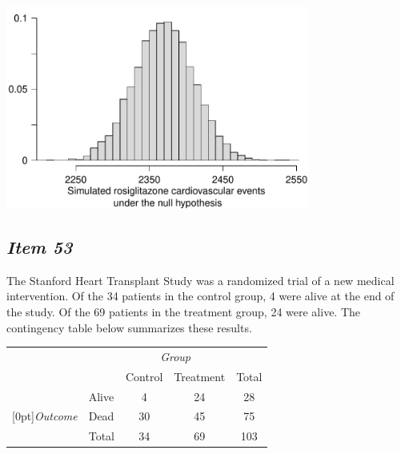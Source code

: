 \begin{center}


\includegraphics[width = 0.75\textwidth]{includes/avandia_RandHist} \\


\end{center}





\subsection{\textbf{\textit{Item 53}}}








The Stanford Heart Transplant Study was a randomized trial of a new medical intervention. Of the 34 patients in the control group, 4 were alive at the end of the study. Of the 69 patients in the treatment group, 24 were alive. The contingency table below summarizes these results.


\begin{center}


\begin{tabular}{ll cc c} 


& & \multicolumn{2}{c}{\textit{Group}} \\


\cline{3-4}


& & Control & Treatment & Total \\


\cline{2-5}


& Alive & 4 & 24 & 28 \\


\raisebox{1.5ex}[0pt]{\emph{Outcome}} & Dead & 30 & 45 & 75\\


\cline{2-5}


& Total & 34 & 69 & 103


\end{tabular}


\end{center}


